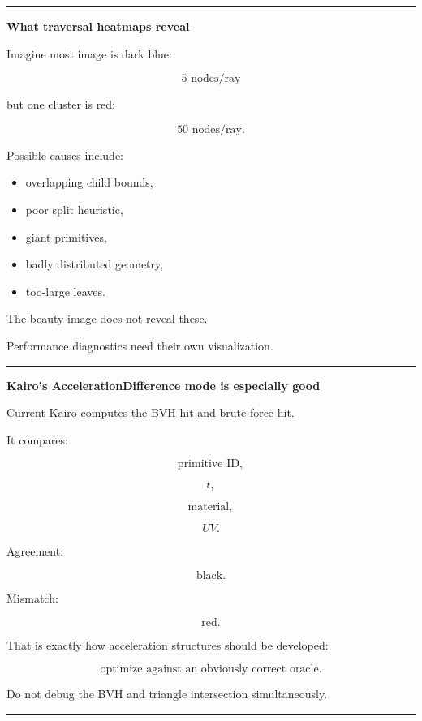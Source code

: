 \begin{center}\rule{0.5\linewidth}{0.5pt}\end{center}

\textbf{What traversal heatmaps reveal}

Imagine most image is dark blue:

\[
5\text{ nodes/ray}
\]

but one cluster is red:

\[
50\text{ nodes/ray}.
\]

Possible causes include:

\begin{itemize}
\tightlist
\item
  overlapping child bounds,
\item
  poor split heuristic,
\item
  giant primitives,
\item
  badly distributed geometry,
\item
  too-large leaves.
\end{itemize}

The beauty image does not reveal these.

Performance diagnostics need their own visualization.

\begin{center}\rule{0.5\linewidth}{0.5pt}\end{center}

\textbf{Kairo's AccelerationDifference mode is especially good}

Current Kairo computes the BVH hit and brute-force hit.

It compares:

\[
\text{primitive ID},
\]

\[
t,
\]

\[
\text{material},
\]

\[
UV.
\]

Agreement:

\[
\text{black}.
\]

Mismatch:

\[
\text{red}.
\]

That is exactly how acceleration structures should be developed:

\[
\boxed{
\text{optimize against an obviously correct oracle}.
}
\]

Do not debug the BVH and triangle intersection simultaneously.

\begin{center}\rule{0.5\linewidth}{0.5pt}\end{center}

